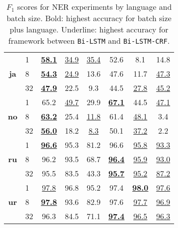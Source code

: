 \begin{table}[h!]
\begin{tabular}{c l c c c|c c c}
        \cmidrule(lr){1-8}
        \multirow{3}{*}{\bfseries ja}
        &  1 &
        \underline{\textbf{58.1}} & \underline{34.9} & \underline{35.4} &
        52.6 &  8.1 & 14.8 \\
        &  8 &
        \underline{\textbf{54.3}} & \underline{24.9} & 13.6 &
        47.6 & 11.7 & \underline{47.3} \\
        & 32 &
        \underline{\textbf{47.9}} & 22.5 &  9.3 &
        44.5 & \underline{27.8} & \underline{45.2} \\

        \cmidrule(lr){1-8}
        \multirow{3}{*}{\bfseries no}
        &  1 &
        65.2 & \underline{49.7} & 29.9 &
        \underline{\textbf{67.1}} & 44.5 & \underline{47.1} \\
        &  8 &
        \underline{\textbf{63.2}} & 25.4 & \underline{11.8} &
        61.4 & \underline{48.1} &  3.4 \\
        & 32 &
        \underline{\textbf{56.0}} & 18.2 &  \underline{8.3 }&
        50.1 & \underline{37.2} &  2.2 \\

        \cmidrule(lr){1-8}
        \multirow{3}{*}{\bfseries ru}
        &  1 &
        \underline{\textbf{96.6}} & 95.3 & 81.2 &
        96.6 & \underline{95.8} & \underline{93.3} \\
        &  8 &
        96.2 & 93.5 & 68.7 &
        \underline{\textbf{96.4}} & \underline{95.9} & \underline{93.0} \\
        & 32 &
        95.5 & 83.5 & 43.3 &
        \underline{\textbf{95.7}} & \underline{95.2} & \underline{87.2} \\

        \cmidrule(lr){1-8}
        \multirow{3}{*}{\bfseries ur}
        &  1 &
        \underline{97.8} & 96.8 & 95.2 &
        97.4 & \underline{\textbf{98.0}} & \underline{97.6} \\
        &  8 &
        \underline{\textbf{97.8}} & 93.6 & 82.9 &
        97.6 & \underline{97.7} & \underline{96.9} \\
        & 32 &
        96.3 & 84.5 & 71.1 &
        \underline{\textbf{97.4}} & \underline{96.5} & \underline{96.3} \\
        \bottomrule
    \end{tabular}
    \caption{$F_{1}$ scores for NER experiments by language and batch
        size. Bold: highest accuracy for batch size plus language. Underline:
        highest accuracy for framework between \texttt{Bi-LSTM} and
        \texttt{Bi-LSTM-CRF}.
    }\label{table:f1-total-ner}
\end{table}


